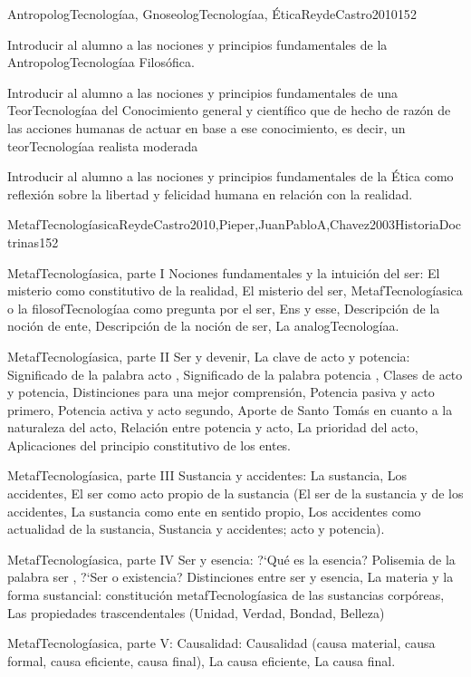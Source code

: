 \begin{syllabus}
\begin{unit}{AntropologTecnologíaa, GnoseologTecnologíaa, Ética}{ReydeCastro2010}{15}{2}
\begin{unitgoals}
	\item Introducir al alumno a las nociones y principios fundamentales de la AntropologTecnologíaa Filosófica.
	\item Introducir al alumno a las nociones y principios fundamentales de una TeorTecnologíaa del Conocimiento general y científico que de hecho de razón de las acciones humanas de actuar en base a ese conocimiento, es decir, un teorTecnologíaa realista moderada
	\item Introducir al alumno a las nociones y principios fundamentales de la Ética como reflexión sobre la libertad y felicidad humana en relación con la realidad.
\end{unitgoals}
\end{unit}

\begin{unit}{MetafTecnologíasica}{ReydeCastro2010,Pieper,JuanPabloA,Chavez2003HistoriaDoctrinas}{15}{2}
\begin{topics}
	\item MetafTecnologíasica, parte I  Nociones fundamentales y la intuición del ser: El misterio como constitutivo de la realidad, El misterio del ser, MetafTecnologíasica o la filosofTecnologíaa como pregunta por el ser, Ens y esse, Descripción de la noción de ente, Descripción de la noción de ser, La analogTecnologíaa.
	\item MetafTecnologíasica, parte II  Ser y devenir, La clave de acto y potencia: Significado de la palabra  acto , Significado de la palabra  potencia , Clases de acto y potencia, Distinciones para una mejor comprensión, Potencia pasiva y acto primero, Potencia activa y acto segundo, Aporte de Santo Tomás en cuanto a la naturaleza del acto, Relación entre potencia y acto, La prioridad del acto, Aplicaciones del principio constitutivo de los entes.
	\item MetafTecnologíasica, parte III  Sustancia y accidentes: La sustancia, Los accidentes, El ser como acto propio de la sustancia (El ser de la sustancia y de los accidentes, La sustancia como ente en sentido propio, Los accidentes como actualidad de la sustancia, Sustancia y accidentes; acto y potencia).
	\item MetafTecnologíasica, parte IV  Ser y esencia: ?`Qué es la esencia? Polisemia de la palabra  ser , ?`Ser o existencia? Distinciones entre ser y esencia, La materia y la forma sustancial: constitución metafTecnologíasica de las sustancias corpóreas, Las propiedades trascendentales (Unidad, Verdad, Bondad, Belleza)
	\item MetafTecnologíasica, parte V: Causalidad: Causalidad (causa material, causa formal, causa eficiente, causa final), La causa eficiente, La causa final.
\end{topics}


\end{unit}
\end{syllabus}
